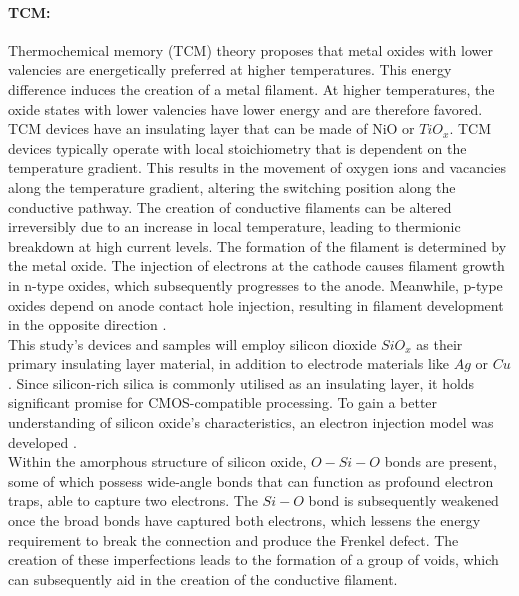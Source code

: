\paragraph{TCM:} Thermochemical memory (TCM) theory proposes that metal oxides with lower valencies are energetically preferred at higher temperatures. This energy difference induces the creation of a metal filament.  At higher temperatures, the oxide states with lower valencies have lower energy and are therefore favored. TCM devices have an insulating layer that can be made of NiO or $TiO_x$\cite{waser2009redox}. TCM devices typically operate with local stoichiometry that is dependent on the temperature gradient. This results in the movement of oxygen ions and vacancies along the temperature gradient, altering the switching position along the conductive pathway. The creation of conductive filaments can be altered irreversibly due to an increase in local temperature, leading to thermionic breakdown at high current levels. The formation of the filament is determined by the metal oxide. The injection of electrons at the cathode causes filament growth in n-type oxides, which subsequently progresses to the anode. Meanwhile, p-type oxides depend on anode contact hole injection, resulting in filament development in the opposite direction \cite{kim2011nanofilamentary}. \\

\noindent This study's devices and samples will employ silicon dioxide $SiO_x$ \cite{mehonic2012resistive} as their primary insulating layer material, in addition to electrode materials like $Ag$ or $Cu$. Since silicon-rich silica is commonly utilised as an insulating layer, it holds significant promise for CMOS-compatible processing.  To gain a better understanding of silicon oxide's characteristics, an electron injection model was developed \cite{gao2016mechanism}. \\

\noindent Within the amorphous structure of silicon oxide, $O-Si-O$ bonds are present, some of which possess wide-angle bonds that can function as profound electron traps, able to capture two electrons. The $Si-O$ bond is subsequently weakened once the broad bonds have captured both electrons, which lessens  the energy requirement to break the connection and produce the Frenkel defect. The creation of these imperfections leads to the formation of a group of voids, which can subsequently aid in the creation of the conductive filament.\\

